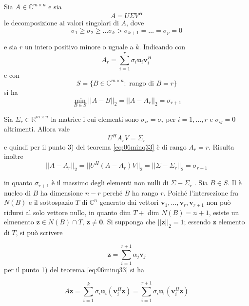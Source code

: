 \begin{theo} Sia $A \in \mathbb{C}^{m \times n}$ e sia
$$ A = U \Sigma V^{H}$$
le decomposizione ai valori singolari di $A$, dove
$$ \sigma_1 \geq \sigma_2 \geq \ldots \sigma_k >
\sigma_{k+1} = \ldots = \sigma_p = 0
$$

e sia $r$ un intero positivo minore o uguale a $k$. Indicando con
$$ A_{r} = \displaystyle \sum_{i=1}^{r} \sigma_i 
\mathbf{u}_{i} \mathbf{v}_{i}^{H} 
$$
e con
$$ S = \{ B \in \mathbb{C}^{m \times n} : \text{ rango di } B = r \}$$
si ha
$$
\min_{B \in S} || A - B||_{2} = ||A - A_{r} ||_{2} = \sigma_{r+1}
 $$
\end{theo}
\begin{thproof}
 Sia $\Sigma_{r} \in \mathbb{R}^{m \times n}$ la matrice i cui
elementi sono $\sigma_{ii} = \sigma_i$ per $i=1, \ldots, r$
e $\sigma_{ij} = 0$ altrimenti. Allora vale
$$ U^{H} A_{r} V = \Sigma_{r} $$
e quindi per il punto 3) del teorema
\ref{eq:06minq33}
\`e di rango $A_{r} = r$. Risulta inoltre
\begin{equation}
\label{eq:06minq49}
 ||A - A_{r}||_{2} = ||U^{H}(A - A_r)V||_{2} = 
|| \Sigma - \Sigma_r||_{2} = \sigma_{r+1}
\end{equation}

in quanto $\sigma_{r+1}$ \`e il massimo degli elementi non nulli di
 $\Sigma −\Sigma_{r}$ . Sia $B \in S$. Il
\`e nucleo di $B$ ha dimensione $n- r$ perch\'e $B$ ha rango $r$. 
Poich\'e l'intersezione
fra $N(B)$ e il sottospazio $T$ di $\mathbb{C}^n$ generato dai vettori $\mathbf{v}_1 , \ldots , \mathbf{v}_{r} , 
\mathbf{v}_{r+1}$ non
pu\`o ridursi al solo vettore nullo, in quanto dim 
 $T  + $ dim $N(B) = n + 1$, esiste un elmenento
$\mathbf{z} \in N(B) \cap T$, $\mathbf{z} \neq \mathbf{0}$.
Si supponga che $||\mathbf{z}||_2 = 1$; essendo
$\mathbf{z}$ elemento di $T$, si pu\`o scrivere

\begin{equation}
\label{eq:06minq50}
\mathbf{z} = \displaystyle \sum_{i=1}^{r+1} \alpha_j
\mathbf{v}_{j}
\end{equation}
per il punto 1) del teorema
\ref{eq:06minq33} si ha

\begin{equation}
\label{eq:06minq51}
A\mathbf{z} = 
\displaystyle \sum_{i=1}^{k}
\sigma_i \mathbf{u}_{i}(\mathbf{v}^{H}_i \mathbf{z})
= \displaystyle \sum_{i=1}^{r+1} \sigma_i \mathbf{u_i}
(\mathbf{v}_{i}^{H}\mathbf{z})
\end{equation}


\end{thproof}
